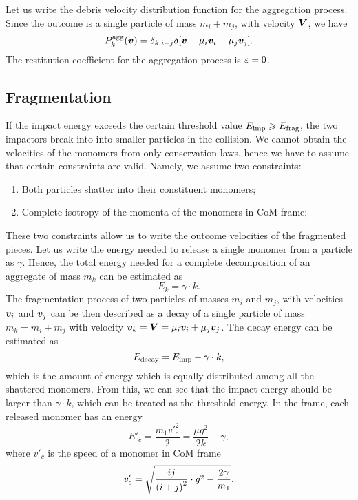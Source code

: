 \documentclass[aps,prl,preprint,groupedaddress,10pt]{revtex4-2}
\begin{document}
Let us write the debris velocity distribution function for the aggregation process. 
Since the outcome is a single particle of mass $m_i+m_j$, with velocity $\vb*{V}$, we have
\begin{equation}
    \utx{P_k}{agg}\pqty{\bv}=\delta_{k,i+j}\delta\bqty{\bv-\mu_i\bv_i-\mu_j\bv_j}.
\end{equation}
The restitution coefficient for the aggregation process is $\varepsilon=0$.

\subsection{Fragmentation}
If the impact energy exceeds the certain threshold value 
$E_{\mathrm{imp}}\geqslant E_{\mathrm{frag}}$, the two impactors break into into smaller
particles in the collision.
We cannot obtain the velocities of the monomers from only conservation laws, hence 
we have to assume that certain constraints are valid. Namely, we assume two 
constraints:
\begin{enumerate}
    \item Both particles shatter into their constituent monomers;
    \item Complete isotropy of the momenta of the monomers in CoM frame;
\end{enumerate}
These two constraints allow us to write the outcome velocities of the fragmented pieces.
Let us write the energy needed to release a single monomer from a particle as $\gamma$.
Hence, the total energy needed for a complete decomposition of an aggregate of mass $m_k$
can be estimated as
\begin{equation}
    E_k = \gamma\cdot k.
\end{equation}
The fragmentation process of two particles of masses $m_i$ and $m_j$, with velocities
$\vb*{v}_i$ and $\vb*{v}_j$ can be then described as a decay of a single particle of mass 
$m_k=m_i+m_j$ with velocity $\vb*{v}_k=\vb*{V}=\mu_i\vb*{v}_i+\mu_j\vb*{v}_j$. The decay energy can 
be estimated as 
\begin{equation}
    E_{\mathrm{decay}}=E_{\mathrm{imp}}-\gamma\cdot k,
\end{equation}
which is the amount of energy which is equally distributed among all the shattered 
monomers. From this, we can see that the impact energy should be larger than 
$\gamma\cdot k$, which can be treated as the threshold energy. In the  frame, each 
released monomer has an energy 
\begin{equation}
    E'_{c}=\frac{m_1v'^2_{c}}{2}=\frac{\mu g^2}{2k}-\gamma,
\end{equation}
where $v'_{c}$ is the speed of a monomer in CoM frame
\begin{equation}
    v'_{c}=\sqrt{\frac{ij}{\pqty{i+j}^2}\cdot g^2-\frac{2\gamma}{m_1}}.
\end{equation}
\end{document}
